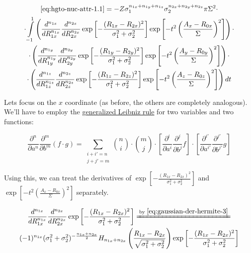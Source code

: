 \documentclass{article}
\newcommand{\equalby}[1]{\xlongequal{\text{by }\eqref{#1}}}
\begin{document}
\begin{appendices}
\begin{equation} \label{eq:hgto-nuc-attr-9}
\begin{gathered}
\eqref{eq:hgto-nuc-attr-1.1} = -Z \sigma_1^{n_{1x} + n_{1y} + n_{1z}} \sigma_2^{n_{2x} + n_{2y} + n_{2z}} \pi \Sigma^2 \cdot \\
\cdot \int\limits_{-1}^1
\left( \frac{d^{n_{1x}}}{dR_{1x}^{n_{1x}}}\frac{d^{n_{2x}}}{dR_{2x}^{n_{2x}}} \exp\left[-\frac{(R_{1x}-R_{2x})^2}{\sigma_1^2 + \sigma_2^2} \right] \exp\left[ - t^2 \left(\frac{A_x-R_{0x}}{\Sigma}\right)^2 \right] \right)
\cdot \\ \cdot
\left( \frac{d^{n_{1y}}}{dR_{1y}^{n_{1y}}}\frac{d^{n_{2y}}}{dR_{2y}^{n_{2y}}} \exp\left[-\frac{(R_{1y}-R_{2y})^2}{\sigma_1^2 + \sigma_2^2} \right] \exp\left[ - t^2 \left(\frac{A_y-R_{0y}}{\Sigma}\right)^2 \right] \right)
\cdot \\ \cdot
\left( \frac{d^{n_{1z}}}{dR_{1z}^{n_{1z}}}\frac{d^{n_{2z}}}{dR_{2z}^{n_{2z}}} \exp\left[-\frac{(R_{1z}-R_{2z})^2}{\sigma_1^2 + \sigma_2^2} \right] \exp\left[ - t^2 \left(\frac{A_z-R_{0z}}{\Sigma}\right)^2 \right] \right)
dt
\end{gathered}
\end{equation}

Lets focus on the \(x\) coordinate (as before, the others are completely analogous). We'll have to employ the \href{https://en.wikipedia.org/wiki/General_Leibniz_rule}{generalized Leibniz rule} for two variables and two functions:

\begin{equation}
\frac{\partial^n}{\partial a^n} \frac{\partial^m}{\partial b^m} (f\cdot g) = \sum_{\substack{i + i' = n \\ j + j' = m}} \binom{n}{i} \cdot \binom{m}{j} \cdot 
\left[ \frac{\partial^i}{\partial a^i} \frac{\partial^j}{\partial b^j} f \right] \cdot 
\left[ \frac{\partial^{i'}}{\partial a^{i'}} \frac{\partial^{j'}}{\partial b^{j'}} g \right]
\end{equation}

Using this, we can treat the derivatives of \(\exp\left[-\frac{(R_{1x}-R_{2x})^2}{\sigma_1^2 + \sigma_2^2} \right]\) and \(\exp\left[ - t^2 \left(\frac{A_x-R_{0x}}{\Sigma}\right)^2 \right]\) separately.

\begin{equation} \label{eq:hgto-nuc-attr-10}
\begin{gathered}
\frac{d^{n_{1x}}}{dR_{1x}^{n_{1x}}}\frac{d^{n_{2x}}}{dR_{2x}^{n_{2x}}} \exp\left[-\frac{(R_{1x}-R_{2x})^2}{\sigma_1^2 + \sigma_2^2} \right] \equalby{eq:gaussian-der-hermite-3} \\
(-1)^{n_{1x}} (\sigma_1^2 + \sigma_2^2)^{-\frac{n_{1x} + n_{2x}}{2}} H_{n_{1x} + n_{2x}}\left(\frac{R_{1x}-R_{2x}}{\sqrt{\sigma_1^2 + \sigma_2^2}}\right) \exp\left[-\frac{(R_{1x}-R_{2x})^2}{\sigma_1^2 + \sigma_2^2} \right]
\end{gathered}
\end{equation}


\end{appendices}
\end{document}
